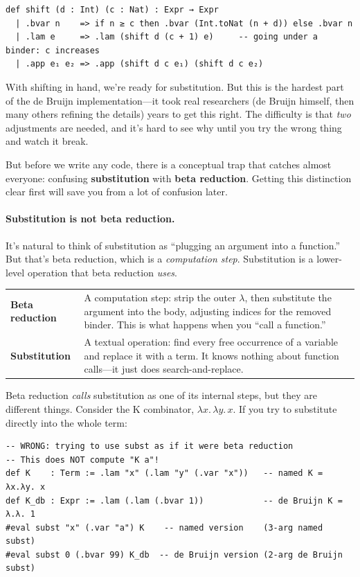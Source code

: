 \documentclass[11pt,a4paper]{article}
\theoremstyle{definition}
\newcommand{\lam}{\lambda}
\begin{document}
\begin{verbatim}
def shift (d : Int) (c : Nat) : Expr → Expr
  | .bvar n    => if n ≥ c then .bvar (Int.toNat (n + d)) else .bvar n
  | .lam e     => .lam (shift d (c + 1) e)     -- going under a binder: c increases
  | .app e₁ e₂ => .app (shift d c e₁) (shift d c e₂)
\end{verbatim}

With shifting in hand, we're ready for substitution. But this is the hardest
part of the de Bruijn implementation---it took real researchers (de Bruijn
himself, then many others refining the details) years to get this right. The
difficulty is that \emph{two} adjustments are needed, and it's hard to see why
until you try the wrong thing and watch it break.

But before we write any code, there is a conceptual trap that catches almost
everyone: confusing \textbf{substitution} with \textbf{beta reduction}. Getting
this distinction clear first will save you from a lot of confusion later.

\paragraph{Substitution is not beta reduction.}
It's natural to think of substitution as ``plugging an argument into a
function.'' But that's beta reduction, which is a \emph{computation step}.
Substitution is a lower-level operation that beta reduction \emph{uses}.

\begin{center}
\renewcommand{\arraystretch}{1.4}
\begin{tabular}{lp{9cm}}
\textbf{Beta reduction} & A computation step: strip the outer $\lam$, then
  substitute the argument into the body, adjusting indices for the removed
  binder. This is what happens when you ``call a function.'' \\
\textbf{Substitution} & A textual operation: find every free occurrence of a
  variable and replace it with a term. It knows nothing about function calls---it
  just does search-and-replace. \\
\end{tabular}
\end{center}

Beta reduction \emph{calls} substitution as one of its internal steps, but they
are different things. Consider the K combinator, $\lam x.\, \lam y.\, x$. If
you try to substitute directly into the whole term:

\begin{verbatim}
-- WRONG: trying to use subst as if it were beta reduction
-- This does NOT compute "K a"!
def K    : Term := .lam "x" (.lam "y" (.var "x"))   -- named K = λx.λy. x
def K_db : Expr := .lam (.lam (.bvar 1))            -- de Bruijn K = λ.λ. 1
#eval subst "x" (.var "a") K    -- named version    (3-arg named subst)
#eval subst 0 (.bvar 99) K_db  -- de Bruijn version (2-arg de Bruijn subst)
\end{verbatim}
\end{document}
